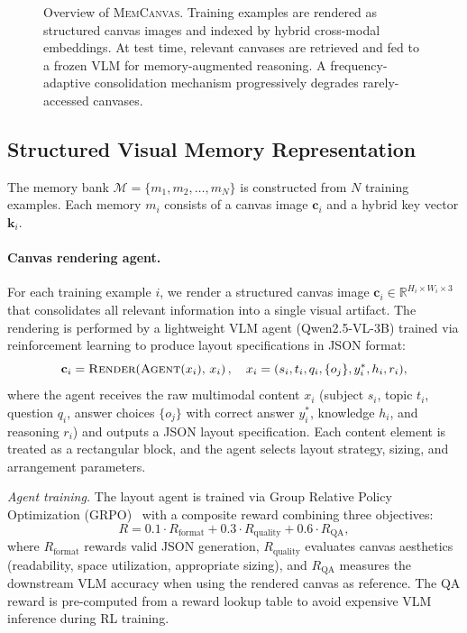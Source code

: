 \documentclass{article}
\newcommand{\memcanvas}{\textsc{MemCanvas}}
\begin{document}
\begin{figure}[t]
  \centering
  \fbox{\rule[-.5cm]{0cm}{4cm} \rule[-.5cm]{4cm}{0cm}}
  \caption{Overview of \memcanvas{}. Training examples are rendered as structured canvas images and indexed by hybrid cross-modal embeddings. At test time, relevant canvases are retrieved and fed to a frozen VLM for memory-augmented reasoning. A frequency-adaptive consolidation mechanism progressively degrades rarely-accessed canvases.}
  \label{fig:overview}
\end{figure}

\subsection{Structured Visual Memory Representation}
\label{sec:representation}

The memory bank $\mathcal{M} = \{m_1, m_2, \dots, m_N\}$ is constructed from $N$ training examples. Each memory $m_i$ consists of a canvas image $\mathbf{c}_i$ and a hybrid key vector $\mathbf{k}_i$.

\paragraph{Canvas rendering agent.}
For each training example $i$, we render a structured canvas image $\mathbf{c}_i \in \mathbb{R}^{H_i \times W_i \times 3}$ that consolidates all relevant information into a single visual artifact. The rendering is performed by a lightweight VLM agent (Qwen2.5-VL-3B) trained via reinforcement learning to produce layout specifications in JSON format:
\begin{equation}
  \mathbf{c}_i = \textsc{Render}\!\left(\textsc{Agent}(x_i),\, x_i\right), \quad x_i = (s_i, t_i, q_i, \{o_j\}, y_i^*, h_i, r_i),
  \label{eq:canvas}
\end{equation}
where the agent receives the raw multimodal content $x_i$ (subject $s_i$, topic $t_i$, question $q_i$, answer choices $\{o_j\}$ with correct answer $y_i^*$, knowledge $h_i$, and reasoning $r_i$) and outputs a JSON layout specification. Each content element is treated as a rectangular block, and the agent selects layout strategy, sizing, and arrangement parameters.

\emph{Agent training.}
The layout agent is trained via Group Relative Policy Optimization (GRPO)~\citep{sheng2025hybridflow} with a composite reward combining three objectives:
\begin{equation}
  R = 0.1 \cdot R_{\text{format}} + 0.3 \cdot R_{\text{quality}} + 0.6 \cdot R_{\text{QA}},
  \label{eq:agent_reward}
\end{equation}
where $R_{\text{format}}$ rewards valid JSON generation, $R_{\text{quality}}$ evaluates canvas aesthetics (readability, space utilization, appropriate sizing), and $R_{\text{QA}}$ measures the downstream VLM accuracy when using the rendered canvas as reference. The QA reward is pre-computed from a reward lookup table to avoid expensive VLM inference during RL training.
\end{document}
